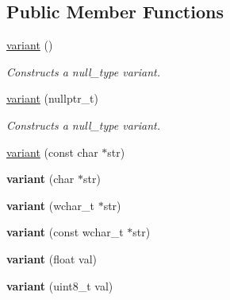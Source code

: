 \subsection*{Public Member Functions}
\begin{DoxyCompactItemize}
\item 
\mbox{\label{classfc_1_1variant_ab18b9c0de85df3571204f86805bf6c5e}} 
\mbox{\hyperlink{classfc_1_1variant_ab18b9c0de85df3571204f86805bf6c5e}{variant}} ()
\begin{DoxyCompactList}\small\item\em Constructs a null\+\_\+type variant. \end{DoxyCompactList}\item 
\mbox{\label{classfc_1_1variant_a08377c8927ed9f8f62211cd9dca566e7}} 
\mbox{\hyperlink{classfc_1_1variant_a08377c8927ed9f8f62211cd9dca566e7}{variant}} (nullptr\+\_\+t)
\begin{DoxyCompactList}\small\item\em Constructs a null\+\_\+type variant. \end{DoxyCompactList}\item 
\mbox{\hyperlink{classfc_1_1variant_a045c86b5101d4e46e30c03dcb2ce9794}{variant}} (const char $\ast$str)
\item 
\mbox{\label{classfc_1_1variant_af645ca0b7a8dc9f545bd1271c34ecf74}} 
{\bfseries variant} (char $\ast$str)
\item 
\mbox{\label{classfc_1_1variant_a737d936a212681bd29cea8afaa1bbda1}} 
{\bfseries variant} (wchar\+\_\+t $\ast$str)
\item 
\mbox{\label{classfc_1_1variant_af63dd9292e7dbee67323047eb8f892ab}} 
{\bfseries variant} (const wchar\+\_\+t $\ast$str)
\item 
\mbox{\label{classfc_1_1variant_a89b8a8bab932ad360be4c8436e1c5dda}} 
{\bfseries variant} (float val)
\item 
\mbox{\label{classfc_1_1variant_ade702fd608763e0c1c44a4297ef22aca}} 
{\bfseries variant} (uint8\+\_\+t val)
\item 
\mbox{\label{classfc_1_1variant_a743d279294b6f1ca9f1e14c01b71802a}} 

\end{DoxyCompactItemize}
